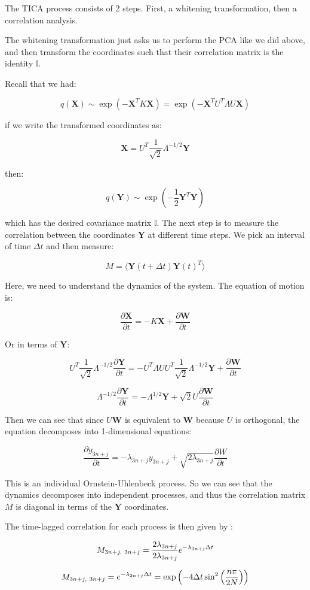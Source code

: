 \documentclass[]{scrartcl}
\newcommand{\p}[1]{\left( #1 \right)}
\newcommand{\w}[1]{\mathbf{#1}}
\newcommand{\parfr}[2]{\frac{\partial #1}{\partial #2}}
\newcommand{\II}{\mathbb{I}}
\newcommand{\h}{\hspace{0.3em}}
\begin{document}
The TICA process consists of 2 steps. First, a whitening transformation, then a correlation analysis.

The whitening transformation just asks us to perform the PCA like we did above, and then transform the coordinates such that their correlation matrix is the identity $\II$.

Recall that we had:

$$
q(\w{X}) \sim \exp(-\w{X}^T K \w{X}) = \exp(-\w{X}^T U^T \Lambda U \w{X})
$$

if we write the transformed coordinates as:

$$
\w{X} = U^T\frac{1}{\sqrt{2}}\Lambda^{-1/2} \w{Y}
$$

then:

$$
q(\w{Y}) \sim \exp\p{-\frac{1}{2}\w{Y}^T\w{Y}}
$$

which has the desired covariance matrix $\II$. The next step is to measure the correlation between the coordinates $\w{Y}$ at different time steps. We pick an interval of time $\Delta t$ and then measure:

$$
M = \langle \w{Y}(t + \Delta t) \w{Y}(t)^T \rangle
$$

Here, we need to understand the dynamics of the system. The equation of motion is:

$$
\parfr{\w{X}}{t} = -K\w{X} + \parfr{\w{W}}{t}
$$

Or in terms of $\w{Y}$:

$$
U^T\frac{1}{\sqrt{2}}\Lambda^{-1/2}
\parfr{\w{Y}}{t} = -U^T\Lambda UU^T\frac{1}{\sqrt{2}}\Lambda^{-1/2}\w{Y} + \parfr{\w{W}}{t}
$$

$$
\Lambda^{-1/2}
\parfr{\w{Y}}{t} = -\Lambda^{1/2}\w{Y} + \sqrt{2}U\parfr{\w{W}}{t}
$$

Then we can see that since $U\w{W}$ is equivalent to $\w{W}$ because $U$ is orthogonal, the equation decomposes into 1-dimensional equations:

$$
\parfr{y_{3n+j}}{t} = -\lambda_{3n+j} y_{3n+j} + \sqrt{2\lambda_{3n+j}}\parfr{W}{t}
$$

This is an individual Ornstein-Uhlenbeck process. So we can see that the dynamics decomposes into independent processes, and thus the correlation matrix $M$ is diagonal in terms of the $\w{Y}$ coordinates.

The time-lagged correlation for each process is then given by :

$$
M_{3n+j, \h 3n+j} = \frac{2\lambda_{3n+j}}{2\lambda_{3n+j}} e^{-\lambda_{3n+j}\Delta t}
$$

$$
M_{3n+j, \h 3n+j} = e^{-\lambda_{3n+j}\Delta t} = \exp\p{-4\Delta t\sin^2\p{\frac{n\pi}{2N}}}
$$
\end{document}
